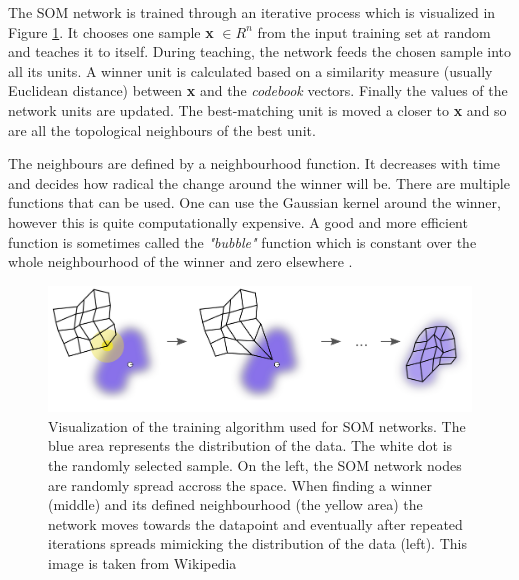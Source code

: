 The SOM network is trained through an iterative process which is visualized in Figure \ref{fig:som_training}. It chooses one sample \textbf{x} \( \in R^n \) from the input training set at random and teaches it to itself. During teaching, the network feeds the chosen sample into all its units. A winner unit is calculated based on a similarity measure (usually Euclidean distance) between \textbf{x} and the \textit{codebook} vectors. Finally the values of the network units are updated. The best-matching unit is moved a closer to \textbf{x} and so are all the topological neighbours of the best unit.

The neighbours are defined by a neighbourhood function. It decreases with time and decides how radical the change around the winner will be. There are multiple functions that can be used. One can use the Gaussian kernel around the winner, however this is quite computationally expensive. A good and more efficient function is sometimes called the \textit{"bubble"} function which is constant over the whole neighbourhood of the winner and zero elsewhere \cite{SOM_training}.

\begin{figure}[H]
\begin{minipage}{\textwidth}
    \centering
	\includegraphics[width=140mm]{./img/Somtraining.png}
	\caption[A visualization of the training used for SOM networks]{Visualization of the training algorithm used for SOM networks. The blue area represents the distribution of the data. The white dot is the randomly selected sample. On the left, the SOM network nodes are randomly spread accross the space. When finding a winner (middle) and its defined neighbourhood (the yellow area) the network moves towards the datapoint and eventually after repeated iterations spreads mimicking the distribution of the data (left). This image is taken from Wikipedia\footnotemark}
	\label{fig:som_training}
\end{minipage}
\end{figure}


